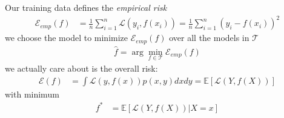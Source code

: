 Our training data defines the \textit{empirical risk}
\begin{align*}
    \mathcal{E}_{emp}(f) &=\frac{1}{n}\sum_{i=1}^{n}\mathcal{L}(y_i,f(x_i))=\frac{1}{n}\sum_{i=1}^{n}\left(y_i - f(x_i)\right)^2
\end{align*}
we choose the model to minimize $\mathcal{E}_{emp}(f)$ over all the models in $\mathcal{T}$
\begin{align*}
    \hat{f} = \arg\min_{f\in\mathcal{T}} \mathcal{E}_{emp}(f)
\end{align*}
\pause{}
 we actually care about is the overall risk:
\begin{align*}
    \mathcal{E}(f)&=\int\mathcal{L}(y,f(x))p(x,y)dxdy = \mathbb{E}\left[\mathcal{L}(Y,f(X))\right]
\end{align*}
\pause{}
with minimum
\begin{align*}
    f^{*}&= \mathbb{E}\left[\mathcal{L}\left(Y,f(X)\right)\vert X=x\right]
\end{align*}
